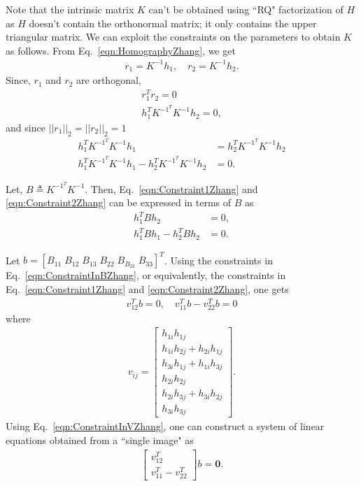 \documentclass{report}
\begin{document}
Note that the intrinsic matrix $K$ can't be obtained using ``RQ" factorization of $H$ as $H$ doesn't contain the orthonormal matrix; it only contains the upper triangular matrix. We can exploit the constraints on the parameters to obtain $K$ as follows.
From Eq.~\ref{eqn:HomographyZhang}, we get
\begin{align}
	r_1 = K^{-1} h_1, \quad r_2 = K^{-1} h_2.
\end{align}
Since, $r_1$ and $r_2$ are orthogonal,
\begin{align}
	r^{T}_1 r_2 = 0 \\
	h^{T}_1 K^{-1^T} K^{-1} h_2 = 0,
	\label{eqn:Constraint1Zhang}
\end{align}
and since $||r_1||_2 = ||r_2||_2 = 1$
\begin{align}
	h^{T}_1 K^{-1^T} K^{-1} h_1 &= h^{T}_2 K^{-1^T} K^{-1} h_2 \\
	h^{T}_1 K^{-1^T} K^{-1} h_1 - h^{T}_2 K^{-1^T} K^{-1} h_2 &= 0.
	\label{eqn:Constraint2Zhang}
\end{align}

Let, $B \triangleq K^{-1^T} K^{-1}$. Then, Eq.~\ref{eqn:Constraint1Zhang} and \ref{eqn:Constraint2Zhang} can be expressed in terms of $B$ as
\begin{align}
	h^{T}_1 B h_2 &= 0, \\
	h^{T}_1 B h_1 - h^{T}_2 B h_2 &= 0.
	\label{eqn:ConstraintInBZhang}
\end{align}

Let $b = [B_{11} \; B_{12} \; B_{13} \; B_{22} \; B_{B_23} \; B_{33}]^{T}$. Using the constraints in Eq.~\ref{eqn:ConstraintInBZhang}, or equivalently, the constraints in Eq.~\ref{eqn:Constraint1Zhang} and \ref{eqn:Constraint2Zhang}, one gets
\begin{align}
	v^{T}_{12} b = 0, \quad v^{T}_{11} b - v^{T}_{22} b = 0
	\label{eqn:ConstraintInVZhang}
\end{align}
where
\begin{align}
	v_{ij}
	=
	\begin{bmatrix}
		h_{1i} h_{1j} \\[5pt]
		h_{1i} h_{2j} + h_{2i} h_{1j} \\[5pt]
		h_{3i} h_{1j} + h_{1i} h_{3j} \\[5pt]
		h_{2i} h_{2j} \\[5pt]
		h_{2i} h_{3j} + h_{3i} h_{2j} \\[5pt]
		h_{3i} h_{3j}
	\end{bmatrix}.
	\label{eqn:ElementsOfVZhang}
\end{align}
Using Eq.~\ref{eqn:ConstraintInVZhang}, one can construct a system of linear equations  obtained from a ``single image" as
\begin{align}
	\begin{bmatrix}
		v^{T}_{12} \\[5pt]
		v^{T}_{11} - v^{T}_{22}
	\end{bmatrix}
	b = \mathbf{0}.
	\label{eqn:BSingleImage}
\end{align}
\end{document}
